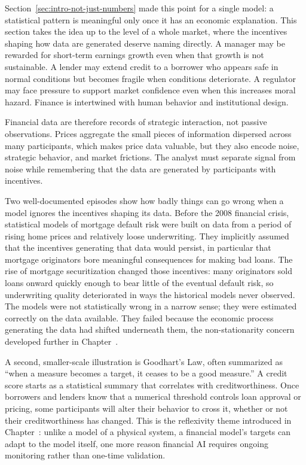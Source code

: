 \documentclass[../ai_in_finance]{subfiles}
\begin{document}
Section~\ref{sec:intro-not-just-numbers} made this point for a single model: a statistical pattern is meaningful only once it has an economic explanation. This section takes the idea up to the level of a whole market, where the incentives shaping how data are generated deserve naming directly. A manager may be rewarded for short-term earnings growth even when that growth is not sustainable. A lender may extend credit to a borrower who appears safe in normal conditions but becomes fragile when conditions deteriorate. A regulator may face pressure to support market confidence even when this increases moral hazard. Finance is intertwined with human behavior and institutional design.

Financial data are therefore records of strategic interaction, not passive observations. Prices aggregate the small pieces of information dispersed across many participants, which makes price data valuable, but they also encode noise, strategic behavior, and market frictions. The analyst must separate signal from noise while remembering that the data are generated by participants with incentives.

Two well-documented episodes show how badly things can go wrong when a model ignores the incentives shaping its data. Before the 2008 financial crisis, statistical models of mortgage default risk were built on data from a period of rising home prices and relatively loose underwriting. They implicitly assumed that the incentives generating that data would persist, in particular that mortgage originators bore meaningful consequences for making bad loans. The rise of mortgage securitization changed those incentives: many originators sold loans onward quickly enough to bear little of the eventual default risk, so underwriting quality deteriorated in ways the historical models never observed.
The models were not statistically wrong in a narrow sense; they were estimated correctly on the data available. They failed because the economic process generating the data had shifted underneath them, the non-stationarity concern developed further in Chapter~.

A second, smaller-scale illustration is Goodhart's Law, often summarized as ``when a measure becomes a target, it ceases to be a good measure.'' A credit score starts as a statistical summary that correlates with creditworthiness. Once borrowers and lenders know that a numerical threshold controls loan approval or pricing, some participants will alter their behavior to cross it, whether or not their creditworthiness has changed. This is the reflexivity theme introduced in Chapter~: unlike a model of a physical system, a financial model's targets can adapt to the model itself, one more reason financial AI requires ongoing monitoring rather than one-time validation.
\end{document}

